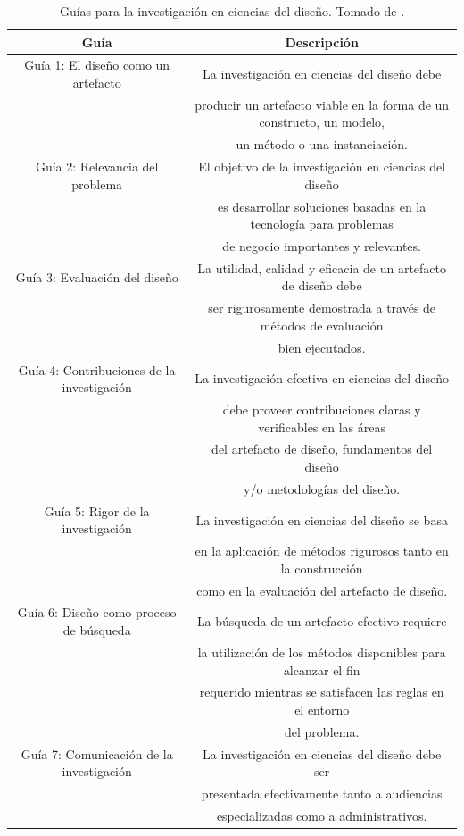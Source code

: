 \begin{table}
\begin{tabular}{|c|c|}
\hline 
Guía & Descripción \\ 
\hline
Guía 1: El diseño como un artefacto & La investigación en ciencias del diseño debe \\
& producir un artefacto viable en la forma de un constructo, un modelo, \\
& un método o una instanciación. \\
\hline
Guía 2: Relevancia del problema & El objetivo de la investigación en ciencias del diseño  \\
& es desarrollar soluciones basadas en la tecnología para problemas \\
& de negocio importantes y relevantes. \\
\hline
Guía 3: Evaluación del diseño & La utilidad, calidad y eficacia de un artefacto de diseño debe \\
& ser rigurosamente demostrada a través de métodos de evaluación \\
& bien ejecutados. \\
\hline
Guía 4: Contribuciones de la investigación & La investigación efectiva en ciencias del diseño  \\
& debe proveer contribuciones claras y verificables en las áreas \\
& del artefacto de diseño, fundamentos del diseño \\
& y/o metodologías del diseño. \\
\hline
Guía 5: Rigor de la investigación & La investigación en ciencias del diseño se basa \\
& en la aplicación de métodos rigurosos tanto en la construcción \\
& como en la evaluación del artefacto de diseño. \\
\hline
Guía 6: Diseño como proceso de búsqueda & La búsqueda de un artefacto efectivo requiere  \\
& la utilización de los métodos disponibles para alcanzar el fin \\
& requerido mientras se satisfacen las reglas en el entorno \\
& del problema. \\
\hline
Guía 7: Comunicación de la investigación & La investigación en ciencias del diseño debe ser \\
& presentada efectivamente tanto a audiencias \\
& especializadas como a administrativos. \\
\hline
\end{tabular} 
\caption{Guías para la investigación en ciencias del diseño. Tomado de \citep{Hevner:2004:DSI:2017212.2017217}.}
\label{tab: guias}
\end{table}

